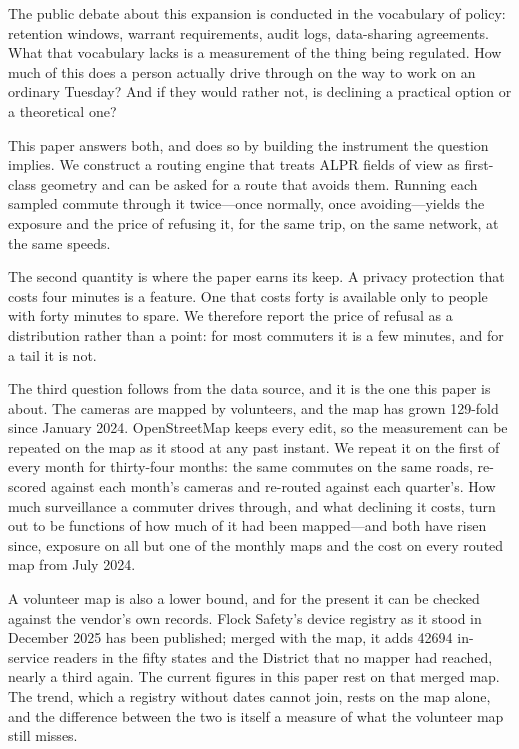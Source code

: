 \documentclass[11pt,twoside]{article}
\newcommand{\alpr}{ALPR\xspace}
\begin{document}
The public debate about this expansion is conducted in the vocabulary of policy: retention
windows, warrant requirements, audit logs, data-sharing agreements. What that vocabulary
lacks is a measurement of the thing being regulated. How much of this does a person
actually drive through on the way to work on an ordinary Tuesday? And if they would rather
not, is declining a practical option or a theoretical one?

This paper answers both, and does so by building the instrument the question implies. We
construct a routing engine that treats \alpr fields of view as first-class geometry and
can be asked for a route that avoids them. Running each sampled commute through it
twice---once normally, once avoiding---yields the exposure and the price of refusing it, for
the same trip, on the same network, at the same speeds.

The second quantity is where the paper earns its keep. A privacy protection that costs
four minutes is a feature. One that costs forty is available only to people with forty
minutes to spare. We therefore report the price of refusal as a distribution rather than a
point: for most commuters it is a few minutes, and for a tail it is not.

The third question follows from the data source, and it is the one this paper is about. The
cameras are mapped by volunteers, and the map has grown 129-fold since January 2024.
OpenStreetMap keeps every edit, so the measurement can be repeated on the map as it stood at
any past instant. We repeat it on the first of every month for thirty-four months: the same
commutes on the same roads, re-scored against each month's cameras and re-routed against each
quarter's. How much surveillance a commuter drives through, and what declining it costs, turn
out to be functions of how much of it had been mapped---and both have risen since, exposure
on all but one of the monthly maps and the cost on every routed map from July 2024.

A volunteer map is also a lower bound, and for the present it can be checked against the
vendor's own records. Flock Safety's device registry as it stood in December 2025 has been
published; merged with the map, it adds \num{42694} in-service readers in the fifty states and
the District that no mapper had reached, nearly a third again. The current figures in this
paper rest on that merged map. The trend, which a registry without dates cannot join, rests on
the map alone, and the difference between the two is itself a measure of what the volunteer
map still misses.
\end{document}
